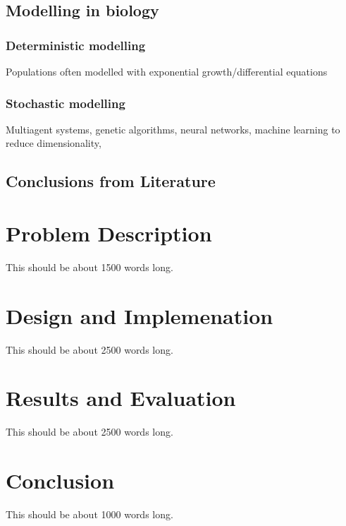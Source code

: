 \documentclass[authoryearcitations]{UoYCSproject}
\begin{document}
\section{Modelling in biology}


\subsection{Deterministic modelling}
Populations often modelled with exponential growth/differential equations

\subsection{Stochastic modelling}
Multiagent systems, genetic algorithms, neural networks, machine learning to reduce dimensionality,

\section{Conclusions from Literature}


\chapter{Problem Description}
\label{cha:Problem Description}
This should be about 1500 words long.

\chapter{Design and Implemenation}
\label{cha:Design and Implementation}
This should be about 2500 words long.

\chapter{Results and Evaluation}
\label{cha:Results and Evaluation}
This should be about 2500 words long.

\chapter{Conclusion}
\label{cha:Conclusion}
This should be about 1000 words long.


 
\end{document}

